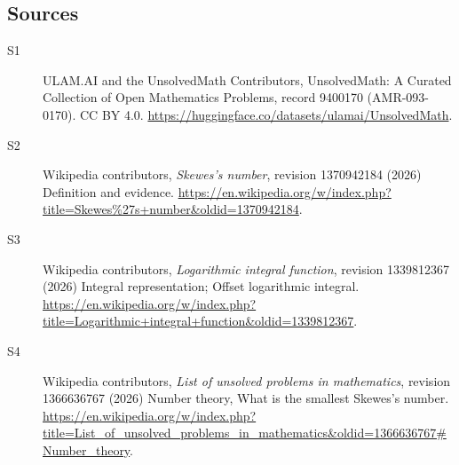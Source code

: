 \documentclass[11pt]{article}
\begin{document}
\subsection{Sources}
\begin{description}
\item[\hypertarget{source:9400170:1}{S1}] ULAM.AI and the UnsolvedMath Contributors, UnsolvedMath: A Curated Collection of Open Mathematics Problems, record 9400170 (AMR-093-0170). CC BY 4.0. \url{https://huggingface.co/datasets/ulamai/UnsolvedMath}.
\item[\hypertarget{source:9400170:2}{S2}] Wikipedia contributors, \emph{Skewes's number}, revision 1370942184 (2026) Definition and evidence. \url{https://en.wikipedia.org/w/index.php?title=Skewes%27s+number&oldid=1370942184}.
\item[\hypertarget{source:9400170:3}{S3}] Wikipedia contributors, \emph{Logarithmic integral function}, revision 1339812367 (2026) Integral representation; Offset logarithmic integral. \url{https://en.wikipedia.org/w/index.php?title=Logarithmic+integral+function&oldid=1339812367}.
\item[\hypertarget{source:9400170:4}{S4}] Wikipedia contributors, \emph{List of unsolved problems in mathematics}, revision 1366636767 (2026) Number theory, What is the smallest Skewes's number. \url{https://en.wikipedia.org/w/index.php?title=List_of_unsolved_problems_in_mathematics&oldid=1366636767#Number_theory}.
\end{description}
\label{end:9400170}
\end{document}
